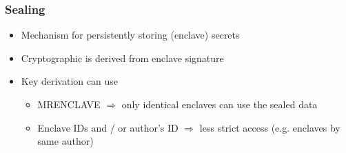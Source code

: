 \begin{frame}
    \frametitle{Sealing}
    \begin{itemize}[<+->]
        \item Mechanism for persistently storing (enclave) secrets
        \item Cryptographic is derived from enclave signature
        \item Key derivation can use
        \begin{itemize}
            \item MRENCLAVE $\Rightarrow$ only identical enclaves can use the sealed data
            \item Enclave IDs and / or author's ID $\Rightarrow$ less strict access (e.g. enclaves by same author)
        \end{itemize}
    \end{itemize}
\end{frame}
